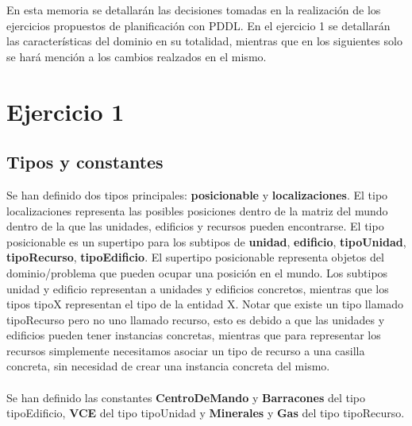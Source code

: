 En esta memoria se detallarán las decisiones tomadas en la realización de los ejercicios propuestos de planificación con PDDL. En el ejercicio 1 se detallarán las características del dominio en su totalidad, mientras que en los siguientes solo se hará mención a los cambios realzados en el mismo.

\section{Ejercicio 1}
\subsection{Tipos y constantes}
Se han definido dos tipos principales: \textbf{posicionable} y \textbf{localizaciones}. El tipo localizaciones representa las posibles posiciones dentro de la matriz del mundo dentro de la que las unidades, edificios y recursos pueden encontrarse. El tipo posicionable es un supertipo para los subtipos de \textbf{unidad}, \textbf{edificio}, \textbf{tipoUnidad}, \textbf{tipoRecurso}, \textbf{tipoEdificio}. El supertipo posicionable representa objetos del dominio/problema que pueden ocupar una posición en el mundo. Los subtipos unidad y edificio representan a unidades y edificios concretos, mientras que los tipos tipoX representan el tipo de la entidad X. Notar que existe un tipo llamado tipoRecurso pero no uno llamado recurso, esto es debido a que las unidades y edificios pueden tener instancias concretas, mientras que para representar los recursos simplemente necesitamos asociar un tipo de recurso a una casilla concreta, sin necesidad de crear una instancia concreta del mismo.
\\\\
Se han definido las constantes \textbf{CentroDeMando} y \textbf{Barracones} del tipo tipoEdificio, \textbf{VCE} del tipo tipoUnidad y \textbf{Minerales} y \textbf{Gas} del tipo tipoRecurso.

